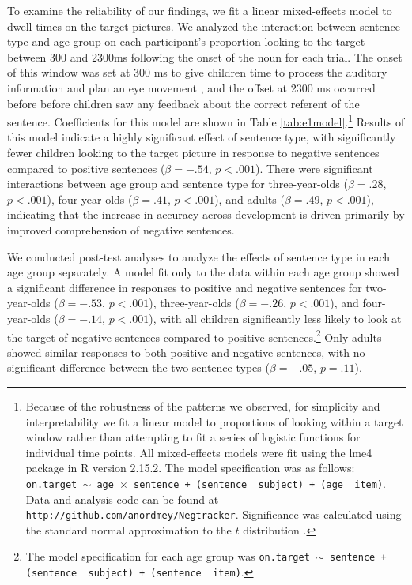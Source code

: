 \documentclass[man]{apa2}
\begin{document}
To examine the reliability of our findings, we fit a linear mixed-effects model to dwell times on the target pictures. We analyzed the interaction between sentence type and age group on each participant's proportion looking to the target between 300 and 2300ms following the onset of the noun for each trial.  The onset of this window was set at 300 ms to give children time to process the auditory information and plan an eye movement \cite{fernald2008, haith1993}, and the offset at 2300 ms occurred before before children saw any feedback about the correct referent of the sentence.   Coefficients for this model are shown in Table \ref{tab:e1model}.\footnote{Because of the robustness of the patterns we observed, for simplicity and interpretability we fit a linear model to proportions of looking within a target window rather than attempting to fit a series of logistic functions for individual time points. All mixed-effects models were fit using the lme4 package in R version 2.15.2.  The model specification was as follows: \texttt{on.target $\sim$ age~$\times$~sentence + (sentence~\textbar~subject) +  (age~\textbar~item)}. Data and analysis code can be found at \texttt{http://github.com/anordmey/Negtracker}.  Significance was calculated using the standard normal approximation to the $t$ distribution \cite{barr2013}.} Results of this model indicate a highly significant effect of sentence type, with significantly fewer children looking to the target picture in response to negative sentences compared to positive sentences ($\beta= -.54$, $p< .001$).   There were significant interactions between age group and sentence type for three-year-olds ($\beta = .28$, $p< .001$), four-year-olds ($\beta = .41$, $p< .001$), and adults ($\beta = .49$, $p< .001$), indicating that the increase in accuracy across development is driven primarily by improved comprehension of negative sentences.  

We conducted post-test analyses to analyze the effects of sentence type in each age group separately.  A model fit only to the data within each age group showed a significant difference in responses to positive and negative sentences for two-year-olds ($\beta = -.53$, $p< .001$), three-year-olds ($\beta = -.26$, $p< .001$), and four-year-olds ($\beta = -.14$, $p< .001$), with all children significantly less likely to look at the target of negative sentences compared to positive sentences.\footnote{The model specification for each age group was \texttt{on.target $\sim$ sentence + (sentence~\textbar~subject) +  (sentence~\textbar~item)}.}  Only adults showed similar responses to both positive and negative sentences, with no significant difference between the two sentence types ($\beta = -.05$, $p=.11$).  
\end{document}
